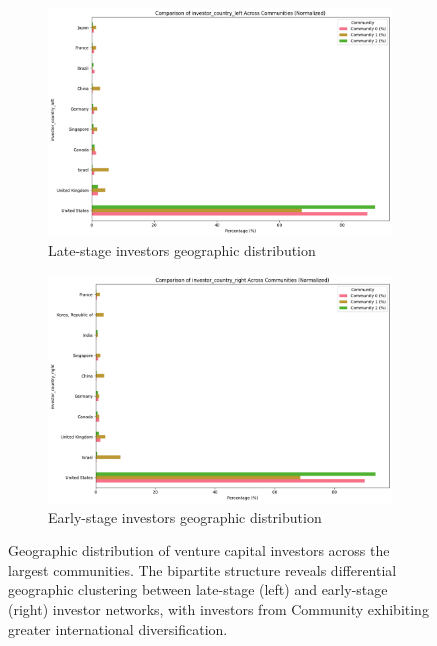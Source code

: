 \documentclass[12pt]{article}
\begin{document}
\begin{figure}[htbp]
\centering
\begin{subfigure}{0.48\textwidth}
    \centering
    \includegraphics[width=\textwidth]{./assets/investor-left-countries.png}
    \caption{Late-stage investors geographic distribution}
    \label{fig:late_stage_geo}
\end{subfigure}
\hfill
\begin{subfigure}{0.48\textwidth}
    \centering
    \includegraphics[width=\textwidth]{./assets/investor-right-countries.png}
    \caption{Early-stage investors geographic distribution}
    \label{fig:early_stage_geo}
\end{subfigure}
\caption{Geographic distribution of venture capital investors across the largest communities. The bipartite structure reveals differential geographic clustering between late-stage (left) and early-stage (right) investor networks, with investors from Community \interestingCommunity{} exhibiting greater international diversification.}
\label{fig:geographic_distribution}
\end{figure}
\end{document}
